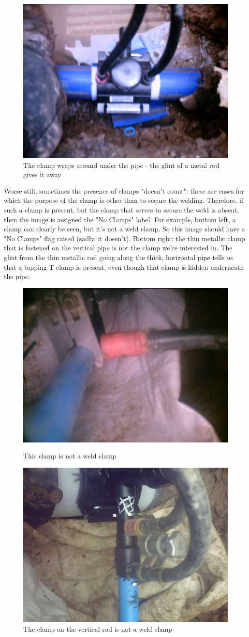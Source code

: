 \documentclass[a4paper,11pt]{article}
\begin{document}
\begin{figure}[h!]
	\centering
	\includegraphics[width=0.35\linewidth]{images/tapping-T.jpg}
	\caption{The clamp wraps around under the pipe - the glint of a metal rod gives it away}
\end{figure}

Worse still, sometimes the presence of clamps "doesn't count": these are cases for which the purpose of the clamp is other than to secure the welding. Therefore, if such a clamp is present, but the clamp that serves to secure the weld is absent, then the image is assigned the "No Clamps" label. For example, bottom left, a clamp can clearly be seen, but it's not a weld clamp. So this image should have a "No Clamps" flag raised (sadly, it doesn't). Bottom right: the thin metallic clamp that is fastened on the vertical pipe is not the clamp we're interested in. The glint from the thin metallic rod going along the thick, horizontal pipe tells us that a tapping-T clamp is present, even though that clamp is hidden underneath the pipe. 

\begin{figure}[h!]
	\centering
	\includegraphics[width=0.35\linewidth]{images/truly_confusing_1.jpg}
	\caption{This clamp is not a weld clamp}
	\includegraphics[width=0.35\linewidth]{images/truly_confusing_2.jpg}
	\caption{The clamp on the vertical rod is not a weld clamp}
\end{figure}
\end{document}
